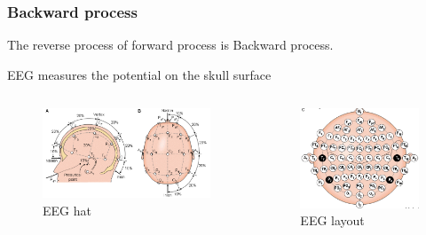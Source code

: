 \documentclass{beamer}
\begin{document}
\begin{frame}
    \frametitle{Backward process}
    The reverse process of forward process is Backward process.

    EEG measures the potential on the skull surface
    \begin{columns}
        \begin{figure}[H]
            \centering
            \includegraphics[height=0.4\textheight]{EEG_hat.png}
            \caption{EEG hat}
            \label{fig: EEG hat}
        \end{figure}

        \begin{figure}[H]
            \centering
            \includegraphics[height=0.4\textheight]{EEG_layout.png}
            \caption{EEG layout}
            \label{fig: EEG layout}
        \end{figure}
    \end{columns}
\end{frame}
\end{document}
